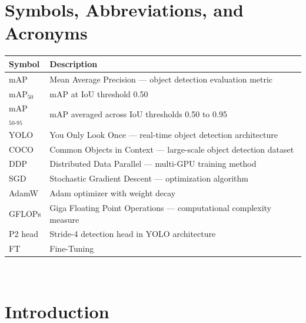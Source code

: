 \documentclass[12pt, titlepage]{article}
\begin{document}
\newpage

\tableofcontents

\newpage

\section{Symbols, Abbreviations, and Acronyms}

\renewcommand{\arraystretch}{1.2}
\begin{tabular}{l l}
  \toprule
  \textbf{Symbol}      & \textbf{Description}                                                \\
  \midrule
  mAP                  & Mean Average Precision --- object detection evaluation metric       \\
  mAP$_{50}$           & mAP at IoU threshold 0.50                                           \\
  mAP$_{50\text{-}95}$ & mAP averaged across IoU thresholds 0.50 to 0.95                     \\
  YOLO                 & You Only Look Once --- real-time object detection architecture      \\
  COCO                 & Common Objects in Context --- large-scale object detection dataset  \\
  DDP                  & Distributed Data Parallel --- multi-GPU training method             \\
  SGD                  & Stochastic Gradient Descent --- optimization algorithm              \\
  AdamW                & Adam optimizer with weight decay                                    \\
  GFLOPs               & Giga Floating Point Operations --- computational complexity measure \\
  P2 head              & Stride-4 detection head in YOLO architecture                        \\
  FT                   & Fine-Tuning                                                         \\
  \bottomrule
\end{tabular}\\

\newpage


\section{Introduction}
\label{sec:intro}
\end{document}
